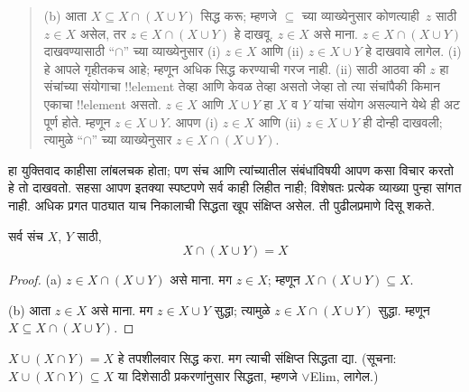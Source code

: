 \documentclass[../../../include/open-logic-section]{subfiles}
\begin{document}
\begin{explain}
\begin{quote}
(b) आता $X \subseteq X \cap (X \cup Y)$ सिद्ध करू; म्हणजे
$\subseteq$ च्या व्याख्येनुसार कोणत्याही~$z$ साठी
$z \in X$ असेल, तर $z \in X \cap
(X \cup Y)$ हे दाखवू. $z \in X$ असे माना. $z \in X
\cap (X \cup Y)$ दाखवण्यासाठी “$\cap$” च्या व्याख्येनुसार
(i) $z \in X$ आणि (ii) $z \in X \cup Y$ हे दाखवावे
लागेल. (i) हे आपले गृहीतकच आहे; म्हणून अधिक
सिद्ध करण्याची गरज नाही. (ii) साठी आठवा की $z$
हा संचांच्या संयोगाचा !!{element} तेव्हा आणि केवळ तेव्हा
असतो जेव्हा तो त्या संचांपैकी किमान एकाचा !!{element}
असतो. $z \in X$ आणि $X \cup Y$ हा $X$ व $Y$ यांचा
संयोग असल्याने येथे ही अट पूर्ण होते. म्हणून
$z \in X \cup Y$. आपण (i) $z \in X$ आणि
(ii) $z \in X \cup Y$ ही दोन्ही दाखवली; त्यामुळे
“$\cap$” च्या व्याख्येनुसार $z \in X \cap (X \cup Y)$.
\end{quote}

हा युक्तिवाद काहीसा लांबलचक होता; पण संच आणि
त्यांच्यातील संबंधांविषयी आपण कसा विचार करतो हे
तो दाखवतो. सहसा आपण इतक्या स्पष्टपणे सर्व काही
लिहीत नाही; विशेषतः प्रत्येक व्याख्या पुन्हा सांगत
नाही. अधिक प्रगत पाठ्यात याच निकालाची सिद्धता
खूप संक्षिप्त असेल. ती पुढीलप्रमाणे दिसू शकते.
\end{explain}

\begin{prop}[शोषण]
सर्व संच $X$, $Y$ साठी,
\[
X \cap (X \cup Y) = X
\]
\end{prop}

\begin{proof}
(a) $z \in X \cap (X \cup Y)$ असे माना. मग $z \in X$;
म्हणून $X \cap (X
  \cup Y) \subseteq X$.

(b) आता $z \in X$ असे माना. मग $z \in X \cup Y$ सुद्धा;
त्यामुळे $z \in X \cap (X \cup Y)$ सुद्धा. म्हणून
$X \subseteq X \cap (X \cup
  Y)$.
\end{proof}

\begin{prob}
$X \cup (X \cap Y) = X$ हे तपशीलवार सिद्ध करा.
मग त्याची संक्षिप्त सिद्धता द्या. (सूचना:
$X \cup (X \cap Y) \subseteq X$ या दिशेसाठी
प्रकरणांनुसार सिद्धता, म्हणजे $\lor$Elim, लागेल.)
\end{prob}
\end{document}
